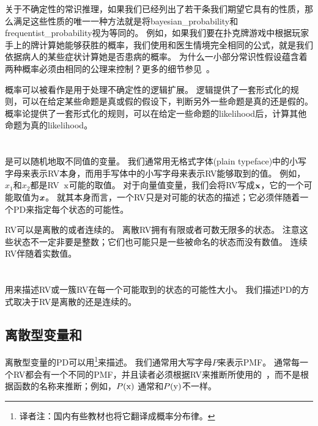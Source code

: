 关于不确定性的常识推理，如果我们已经列出了若干条我们期望它具有的性质，那么满足这些性质的唯一一种方法就是将\gls{bayesian_probability}和\gls{frequentist_probability}视为等同的。
例如，如果我们要在扑克牌游戏中根据玩家手上的牌计算她能够获胜的概率，我们使用和医生情境完全相同的公式，就是我们依据病人的某些症状计算她是否患病的概率。
为什么一小部分常识性假设蕴含着两种概率必须由相同的公理来控制？更多的细节参见~\cite{Ramsey1926}。


概率可以被看作是用于处理不确定性的逻辑扩展。
逻辑提供了一套形式化的规则，可以在给定某些命题是真或假的假设下，判断另外一些命题是真的还是假的。
概率论提供了一套形式化的规则，可以在给定一些命题的\gls{likelihood}后，计算其他命题为真的\gls{likelihood}。

\section{}
\label{sec:random_variables}

是可以随机地取不同值的变量。
我们通常用无格式字体(plain typeface)中的小写字母来表示\gls{RV}本身，而用手写体中的小写字母来表示\gls{RV}能够取到的值。
例如，$x_1$和$x_2$都是\gls{RV}~$\mathrm{x}$可能的取值。
对于向量值变量，我们会将\gls{RV}写成$\mathbf{x}$，它的一个可能取值为$\boldsymbol{\mathit{x}}$。
就其本身而言，一个\gls{RV}只是对可能的状态的描述；它必须伴随着一个\gls{PD}来指定每个状态的可能性。

\gls{RV}可以是离散的或者连续的。
离散\gls{RV}拥有有限或者可数无限多的状态。
注意这些状态不一定非要是整数；它们也可能只是一些被命名的状态而没有数值。
连续\gls{RV}伴随着实数值。

\section{}
\label{sec:probability_distributions}

用来描述\gls{RV}或一簇\gls{RV}在每一个可能取到的状态的可能性大小。
我们描述\gls{PD}的方式取决于\gls{RV}是离散的还是连续的。

\subsection{离散型变量和}
\label{sec:discrete_variables_and_probability_mass_functions}

离散型变量的\gls{PD}可以用\footnote{译者注：国内有些教材也将它翻译成概率分布律。}来描述。
我们通常用大写字母$P$来表示\gls{PMF}。
通常每一个\gls{RV}都会有一个不同的\gls{PMF}，并且读者必须根据\gls{RV}来推断所使用的~，而不是根据函数的名称来推断；例如，$P(\mathrm{x})$ 通常和$P(\mathrm{y})$不一样。

